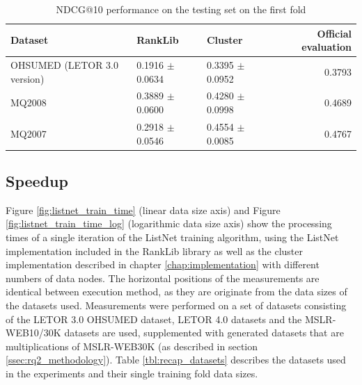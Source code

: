 \begin{table}
\centering
\begin{tabular}{p{3.5cm}p{2.6cm}p{2.6cm}r}\toprule
Dataset & RankLib & Cluster & Official evaluation \\
\midrule
OHSUMED (LETOR 3.0 version) & 0.1916 $\pm$ 0.0634 & 0.3395 $\pm$ 0.0952 & 0.3793 \\
MQ2008      				& 0.3889 $\pm$ 0.0600 & 0.4280 $\pm$ 0.0998 & 0.4689 \\
MQ2007      				& 0.2918 $\pm$ 0.0546 & 0.4554 $\pm$ 0.0085 & 0.4767 \\
\bottomrule
\end{tabular}
\caption{\acs{NDCG}@10 performance on the testing set on the first fold}
\label{tbl:accuracy_comparison}
\end{table}

\subsection{Speedup}
\label{ssec:speedup}
Figure \ref{fig:listnet_train_time} (linear data size axis) and Figure \ref{fig:listnet_train_time_log} (logarithmic data size axis) show the processing times of a single iteration of the ListNet training algorithm, using the ListNet implementation included in the RankLib library as well as the cluster implementation described in chapter \ref{chap:implementation} with different numbers of data nodes. The horizontal positions of the measurements are identical between execution method, as they are originate from the data sizes of the datasets used. Measurements were performed on a set of datasets consisting of the LETOR 3.0 OHSUMED dataset, LETOR 4.0 datasets and the MSLR-WEB10/30K datasets are used, supplemented with generated datasets that are multiplications of MSLR-WEB30K (as described in section \ref{ssec:rq2_methodology}). Table \ref{tbl:recap_datasets} describes the datasets used in the experiments and their single training fold data sizes.\\

